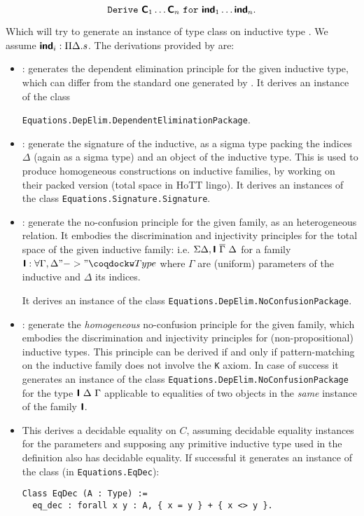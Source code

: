 \[\mathtt{Derive}~\textbf{\mbox{\textsf{C}}}_1 \ldots \textbf{\mbox{\textsf{C}}}_n~\mathtt{for}~\textbf{\mbox{\textsf{ind}}}_1 \ldots \textbf{\mbox{\textsf{ind}}}_n.\]

Which will try to generate an instance of type class  on
inductive type . We assume $\textbf{\mbox{\textsf{ind}}}_i : \Pi \Delta. s$.
The derivations provided by \Equations are:

\begin{itemize}
\item {}: generates the dependent
  elimination principle for the given inductive type, which can differ
  from the standard one generated by \Coq.
  It derives an instance of the class

  \texttt{Equations.DepElim.DependentEliminationPackage}.
\item {}: generate the signature of the inductive, as a
  sigma type packing the indices $\Delta$ (again as a sigma type) and
  an object of the inductive type. This is used to produce homogeneous
  constructions on inductive families, by working on their packed
  version (total space in HoTT lingo).
  It derives an instances of the class
  \texttt{Equations.Signature.Signature}.

\item {}: generate the no-confusion principle for the
  given family, as an heterogeneous relation. It embodies the
  discrimination and injectivity principles for the
  total space of the given inductive family: i.e.
  $\Sigma \Delta, \textbf{\mbox{\textsf{I}}}~{\overline \Gamma}~\Delta$ for a family
  $\ind{I} : \forall \Gamma, \Delta "->" \kw{Type}$ where $\Gamma$ are
  (uniform) parameters of the inductive and $\Delta$ its indices.

  It derives an instance of the class \texttt{Equations.DepElim.NoConfusionPackage}.

\item {}: generate the \emph{homogeneous} no-confusion
  principle for the given family, which embodies the discrimination and
  injectivity principles for (non-propositional) inductive types.
  This principle can be derived if and only if pattern-matching on the
  inductive family does not involve the \texttt{K} axiom.
  In case of success it generates an instance of the class
  \texttt{Equations.DepElim.NoConfusionPackage} for the type $\textbf{\mbox{\textsf{I}}}~
  \Delta~\Gamma$ applicable to equalities of two objects in the \emph{same}
  instance of the family $\textbf{\mbox{\textsf{I}}}$.

\item {}
  This derives a decidable equality on $C$, assuming decidable equality 
  instances for the parameters and supposing any primitive inductive
  type used in the definition also has decidable equality. If
  successful it generates an instance of the class (in \texttt{Equations.EqDec}):
\begin{verbatim}
Class EqDec (A : Type) :=
  eq_dec : forall x y : A, { x = y } + { x <> y }.
\end{verbatim}
  

\end{itemize}
